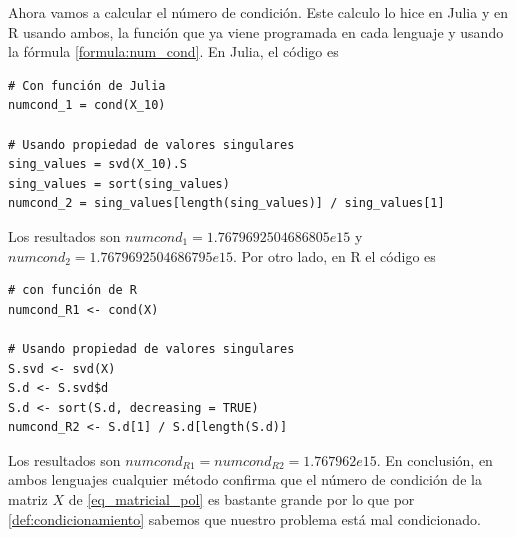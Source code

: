 Ahora vamos a calcular el número de condición. Este calculo lo hice en Julia y en R usando ambos, la función que ya viene programada en cada lenguaje y usando la fórmula \ref{formula:num_cond}. En Julia, el código es 

\begin{verbatim}
# Con función de Julia
numcond_1 = cond(X_10)

# Usando propiedad de valores singulares
sing_values = svd(X_10).S
sing_values = sort(sing_values)
numcond_2 = sing_values[length(sing_values)] / sing_values[1]
\end{verbatim}

Los resultados son $numcond_1 = 1.7679692504686805e15$ y $numcond_2 = 1.7679692504686795e15$. Por otro lado, en R el código es 

\begin{verbatim}
# con función de R
numcond_R1 <- cond(X)

# Usando propiedad de valores singulares
S.svd <- svd(X)
S.d <- S.svd$d
S.d <- sort(S.d, decreasing = TRUE)
numcond_R2 <- S.d[1] / S.d[length(S.d)]
\end{verbatim}

Los resultados son $numcond_{R1} = numcond_{R2} = 1.767962e{15}$. En conclusión, en ambos lenguajes cualquier método confirma que el número de condición de la matriz $X$ de \ref{eq_matricial_pol} es bastante grande por lo que por \ref{def:condicionamiento} sabemos que nuestro problema está mal condicionado. 







